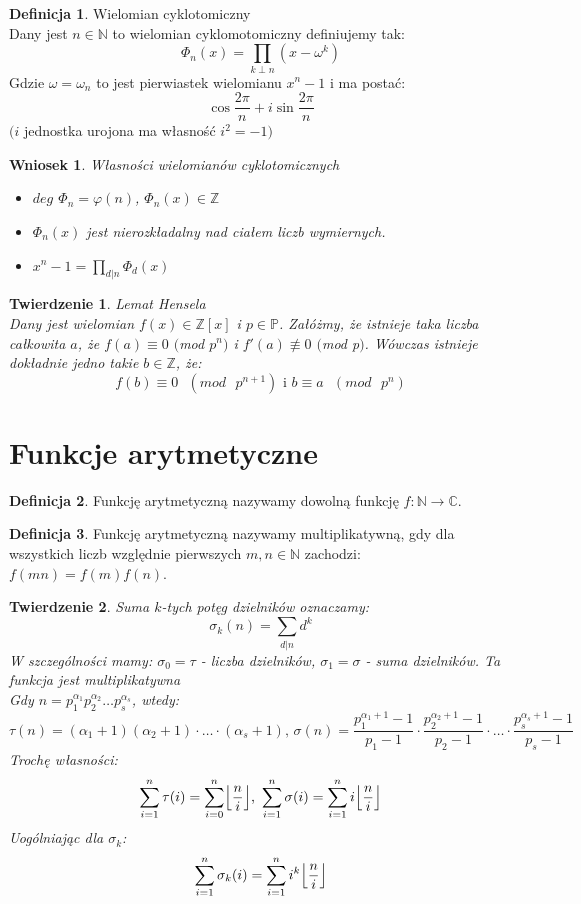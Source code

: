 \documentclass[10pt,a4paper]{article}
\theoremstyle{plain}
\newtheorem{thm}{Twierdzenie}[section]
\newtheorem*{cor}{Wniosek}
\theoremstyle{definition}
\newtheorem{defi}{Definicja}[section]
\theoremstyle{remark}
\newcommand{\N}{\mathbb{N}}
\newcommand{\Z}{\mathbb{Z}}
\newcommand{\p}{\mathbb{P}}
\newcommand{\C}{\mathbb{C}}
\begin{document}
	\begin{defi}{Wielomian cyklotomiczny}
		\\
		Dany jest $n\in\N$ to wielomian cyklomotomiczny definiujemy tak:
		$$\Phi_n(x)=\prod_{k \perp n}(x-\omega^k)$$
		Gdzie $\omega=\omega_n$ to jest pierwiastek wielomianu $x^n-1$ i ma postać: 
		$$\cos{\frac{2\pi}{n}}+i\sin{\frac{2\pi}{n}}$$ $(i$ jednostka urojona ma własność $i^2=-1)$
	\end{defi}
	\begin{cor}{Własności wielomianów cyklotomicznych}
		\begin{itemize}
			\item $deg$ $\Phi_n=\varphi(n)$, $\Phi_n(x) \in \Z$
			\item $\Phi_n(x)$ jest nierozkładalny nad ciałem liczb wymiernych.
			\item $x^n-1=\prod_{d|n} \Phi_d(x)$
		\end{itemize}
	\end{cor}
	\begin{thm}{Lemat Hensela}
		\\
		Dany jest wielomian $f(x) \in \Z[x]$ i $p \in \p$. Załóżmy, że istnieje taka liczba całkowita $a$, że $f(a) \equiv 0$ $($mod $p^n$$)$ i $f'(a) \not\equiv 0$ $($mod p$)$. Wówczas istnieje dokładnie jedno takie $b \in \Z$, że: 
		$$f(b) \equiv 0\textrm{ }(mod\textrm{ }p^{n+1})\textrm{ i } b \equiv a\textrm{ }(mod\textrm{ }p^{n})$$
	\end{thm}
	
	\section{Funkcje arytmetyczne}
	\begin{defi} Funkcję arytmetyczną nazywamy dowolną funkcję $f:\N \longrightarrow \C$.
	\end{defi}
	\begin{defi} Funkcję arytmetyczną nazywamy multiplikatywną, gdy dla wszystkich liczb względnie pierwszych $m,n \in \N$ zachodzi: $f(mn)=f(m)f(n)$.
	\end{defi}
	\begin{thm}
		Suma $k$-tych potęg dzielników oznaczamy:
		$$\sigma_k(n)=\sum_{d|n}d^k$$
		W szczególności mamy: $\sigma_0=\tau$ - liczba dzielników, $\sigma_1=\sigma$ - suma dzielników. Ta funkcja jest multiplikatywna
		\\ Gdy $n=p_1^{\alpha_1}p_2^{\alpha_2}\ldots p_s^{\alpha_s}$, wtedy:
		$$\tau(n)=(\alpha_1+1)(\alpha_2+1)\cdot \ldots \cdot(\alpha_s+1)\textrm{, } \sigma(n)=\frac{p_1^{\alpha_1+1}-1}{p_1-1}\cdot \frac{p_2^{\alpha_2+1}-1}{p_2-1}\cdot \ldots \cdot \frac{p_s^{\alpha_s+1}-1}{p_s-1}$$
		Trochę własności:
		$$\sum_{i=1}^{n} \tau(i)=\sum_{i=0}^{n} \Bigl\lfloor \frac{n}{i} \Bigr\rfloor \textrm{, } 
		\sum_{i=1}^{n}\sigma(i)=\sum_{i=1}^{n}i\Bigl\lfloor \frac{n}{i} \Bigr\rfloor$$
		Uogólniając dla $\sigma_k$:
		$$\sum_{i=1}^{n}\sigma_k(i)=\sum_{i=1}^{n}i^k\Bigl\lfloor \frac{n}{i} \Bigr\rfloor$$
	\end{thm}
	
\end{document}
